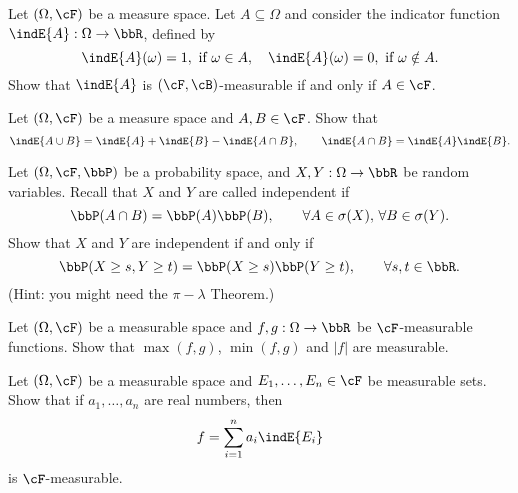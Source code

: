 \begin{problem}
    Let $(\Omega,\cF)$ be a measure space. Let $A\subseteq \Omega$ and consider the indicator function $\indE{A} : \Omega\to \bbR$, defined by 
    \begin{equation*}
        \indE{A}(\omega) = 1, \text{ if $\omega\in A$},\quad  \indE{A}(\omega) = 0, \text{ if $\omega\notin A$}.
    \end{equation*}
    Show that $\indE{A}$ is $(\cF,\cB)$-measurable if and only if $A\in \cF$.
\end{problem}

\begin{problem}
    Let $(\Omega,\cF)$ be a measure space and $A,B\in \cF$. Show that
    \begin{equation*}
        \indE{A\cup B} = \indE{A} + \indE{B} - \indE{A\cap B},\qquad \indE{A\cap B} = \indE{A} \indE{B}. 
    \end{equation*}
\end{problem}

\begin{problem}
    Let $(\Omega,\cF,\bbP)$ be a probability space, and $X,Y:\Omega\to \bbR$ be random variables. Recall that $X$ and $Y$ are called independent if
    \begin{equation*}
        \bbP(A\cap B) = \bbP(A)\bbP(B),\qquad\forall A\in \sigma(X),\, \forall B\in \sigma(Y).
    \end{equation*} 
    Show that $X$ and $Y$ are independent if and only if 
    \begin{equation*}
        \bbP(X\geq s, Y\geq t) = \bbP(X\geq s) \bbP(Y\geq t),\qquad\forall s,t\in \bbR.
    \end{equation*} 
    (Hint: you might need the $\pi-\lambda$ Theorem.)
\end{problem}

\begin{problem}
    Let $(\Omega,\cF)$ be a measurable space and $f,g:\Omega\to \bbR$ be  $\cF$-measurable functions. Show that $\max(f,g)$, $\min(f,g)$ and $|f|$ are measurable. 
\end{problem}

\begin{problem} Let $(\Omega,\cF)$ be a measurable space and $E_1,\ldots,E_n\in \cF$ be measurable sets. Show that if $a_1,\ldots,a_n$ are real numbers, then
\begin{equation*}
    f = \sum_{i=1}^n a_i \indE{E_i}
\end{equation*}
is $\cF$-measurable.
\end{problem}

